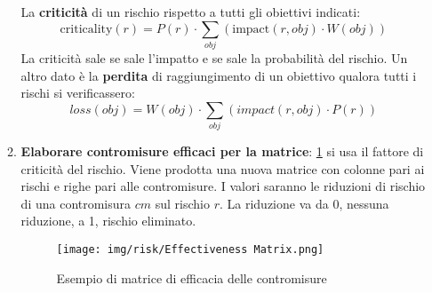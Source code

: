 \begin{enumerate}
\begin{enumerate}
                    La \textbf{criticità} di un rischio rispetto a tutti gli
                    obiettivi indicati:
                    \begin{equation}
                        \text{criticality}(r) = P(r) \cdot \sum_{obj}
                        (\text{impact}(r, obj) \cdot W(obj))
                    \end{equation}
                    La criticità sale se sale l'impatto e se sale la probabilità
                    del rischio. Un altro dato è la \textbf{perdita} di raggiungimento
                    di un obiettivo qualora tutti i rischi si verificassero:
                    \begin{equation}
                        loss(obj) = W(obj) \cdot \sum_{obj} (impact(r, obj) \cdot P(r))
                    \end{equation}
              \item \textbf{Elaborare contromisure efficaci per la matrice}:
                    \ref{fig:eff-matrix} si usa il fattore di criticità del
                    rischio. Viene prodotta una nuova matrice con colonne pari
                    ai rischi e righe pari alle contromisure. I valori saranno
                    le riduzioni di rischio di una contromisura $cm$ sul rischio
                    $r$. La riduzione va da 0, nessuna riduzione, a 1, rischio
                    eliminato.
                    \begin{figure}[!ht]
                        \centering
                        \texttt{[image: img/risk/Effectiveness Matrix.png]}
                        \caption{Esempio di matrice di efficacia delle contromisure}
                        \label{fig:eff-matrix}
                    \end{figure}


\end{enumerate}
\end{enumerate}
